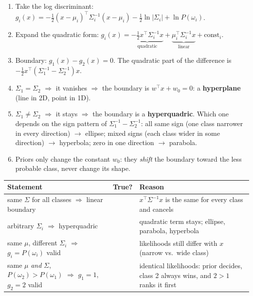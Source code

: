 \documentclass[11pt,a4paper]{article}
\newcommand{\ok}{\textcolor{rightc}{\ding{51}}}
\newcommand{\bad}{\textcolor{wrongc}{\ding{55}}}
\begin{document}
\begin{steps}
\begin{enumerate}[leftmargin=*]
  \item Take the log discriminant:
        $g_i(x) = -\tfrac12(x-\mu_i)^\top\Sigma_i^{-1}(x-\mu_i) - \tfrac12\ln|\Sigma_i| + \ln P(\omega_i)$.
  \item Expand the quadratic form:
        $g_i(x) = \underbrace{-\tfrac12 x^\top\Sigma_i^{-1}x}_{\text{quadratic}}
        + \underbrace{\mu_i^\top\Sigma_i^{-1}x}_{\text{linear}} + \text{const}_i$.
  \item Boundary: $g_1(x)-g_2(x)=0$. The quadratic part of the difference is
        $-\tfrac12 x^\top(\Sigma_1^{-1}-\Sigma_2^{-1})x$.
  \item $\Sigma_1=\Sigma_2$ $\Rightarrow$ it vanishes $\Rightarrow$ the boundary is
        $w^\top x + w_0 = 0$: a \textbf{hyperplane} (line in 2D, point in 1D).
  \item $\Sigma_1\ne\Sigma_2$ $\Rightarrow$ it stays $\Rightarrow$ the boundary is a
        \textbf{hyperquadric}. Which one depends on the sign pattern of
        $\Sigma_1^{-1}-\Sigma_2^{-1}$: all same sign (one class narrower in every
        direction) $\to$ ellipse; mixed signs (each class wider in some
        direction) $\to$ hyperbola; zero in one direction $\to$ parabola.
  \item Priors only change the constant $w_0$: they \emph{shift} the boundary
        toward the less probable class, never change its shape.
\end{enumerate}
\end{steps}

\begin{center}\small
\begin{tabularx}{\linewidth}{@{}>{\raggedright\arraybackslash}p{5.2cm}c X@{}}
  \toprule
  Statement & True? & Reason \\
  \midrule
  same $\Sigma$ for all classes $\Rightarrow$ linear boundary & \ok &
    $x^\top\Sigma^{-1}x$ is the same for every class and cancels \\
  arbitrary $\Sigma_i$ $\Rightarrow$ hyperquadric & \ok & quadratic term
    stays; ellipse, parabola, hyperbola \\
  same $\mu$, different $\Sigma_i$ $\Rightarrow$ $g_i=P(\omega_i)$ valid & \bad &
    likelihoods still differ with $x$ (narrow vs.\ wide class) \\
  same $\mu$ \emph{and} $\Sigma$, $P(\omega_2)>P(\omega_1)$ $\Rightarrow$
    $g_1=1$, $g_2=2$ valid & \ok & identical likelihoods: prior decides, class 2
    always wins, and $2>1$ ranks it first \\
  \bottomrule
\end{tabularx}
\end{center}
\end{document}
